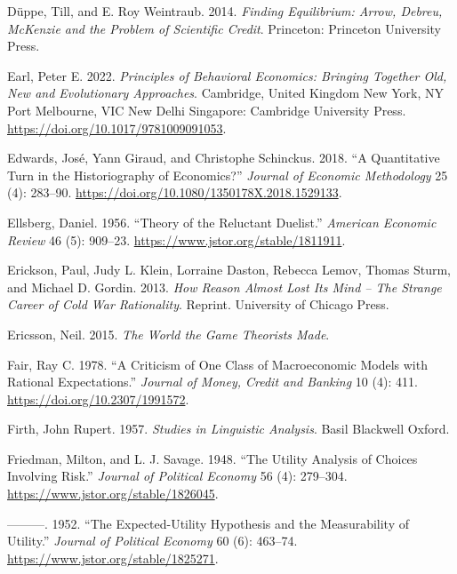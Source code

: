 \documentclass[
]{interact}
\newlength{\cslhangindent}
\newenvironment{CSLReferences}[2] %
 {\begin{list}{}{%
  \setlength{\itemindent}{0pt}
  \setlength{\leftmargin}{0pt}
  \setlength{\parsep}{0pt}
  \ifodd #1
   \setlength{\leftmargin}{\cslhangindent}
   \setlength{\itemindent}{-1\cslhangindent}
  \fi
  \setlength{\itemsep}{#2\baselineskip}}}
 {\end{list}}
\begin{document}
\begin{CSLReferences}{1}{0}
Düppe, Till, and E. Roy Weintraub. 2014. \emph{Finding Equilibrium:
{Arrow}, {Debreu}, {McKenzie} and the Problem of Scientific Credit}.
Princeton: Princeton University Press.

Earl, Peter E. 2022. \emph{Principles of Behavioral Economics: Bringing
Together Old, New and Evolutionary Approaches}. Cambridge, United
Kingdom New York, NY Port Melbourne, VIC New Delhi Singapore: Cambridge
University Press. \url{https://doi.org/10.1017/9781009091053}.

Edwards, José, Yann Giraud, and Christophe Schinckus. 2018. {``A
Quantitative Turn in the Historiography of Economics?''} \emph{Journal
of Economic Methodology} 25 (4): 283--90.
\url{https://doi.org/10.1080/1350178X.2018.1529133}.

Ellsberg, Daniel. 1956. {``Theory of the {Reluctant Duelist}.''}
\emph{American Economic Review} 46 (5): 909--23.
\url{https://www.jstor.org/stable/1811911}.

Erickson, Paul, Judy L. Klein, Lorraine Daston, Rebecca Lemov, Thomas
Sturm, and Michael D. Gordin. 2013. \emph{{How Reason Almost Lost Its
Mind -- The Strange Career of Cold War Rationality}}. Reprint.
University of Chicago Press.

Ericsson, Neil. 2015. \emph{The {World} the {Game Theorists Made}}.

Fair, Ray C. 1978. {``A {Criticism} of {One Class} of {Macroeconomic
Models} with {Rational Expectations}.''} \emph{Journal of Money, Credit
and Banking} 10 (4): 411. \url{https://doi.org/10.2307/1991572}.

Firth, John Rupert. 1957. \emph{Studies in Linguistic Analysis}. Basil
Blackwell Oxford.

Friedman, Milton, and L. J. Savage. 1948. {``The {Utility Analysis} of
{Choices Involving Risk}.''} \emph{Journal of Political Economy} 56 (4):
279--304. \url{https://www.jstor.org/stable/1826045}.

---------. 1952. {``The {Expected-Utility Hypothesis} and the
{Measurability} of {Utility}.''} \emph{Journal of Political Economy} 60
(6): 463--74. \url{https://www.jstor.org/stable/1825271}.


\end{CSLReferences}
\end{document}
